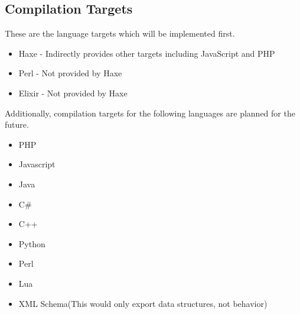 \documentclass[hidelinks]{article}
\begin{document}
\subsection{Compilation Targets}
These are the language targets which will be implemented first.
	\begin{itemize}
		\item Haxe - Indirectly provides other targets including JavaScript and PHP
		\item Perl - Not provided by Haxe
		\item Elixir - Not provided by Haxe
	\end{itemize}
Additionally, compilation targets for the following languages are planned for the future.
	\begin{itemize}
		\item PHP
		\item Javascript
		\item Java
		\item C\#
		\item C++
		\item Python
		\item Perl
		\item Lua
		\item XML Schema(This would only export data structures, not behavior)
	\end{itemize}
\end{document}
